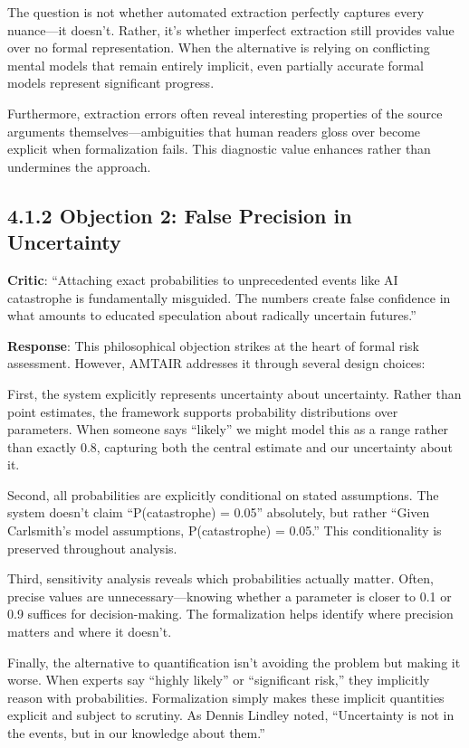 \documentclass[
  11pt,
  letterpaper,
  openany]{book}
\begin{document}
The question is not whether automated extraction perfectly captures
every nuance---it doesn't. Rather, it's whether imperfect extraction
still provides value over no formal representation. When the alternative
is relying on conflicting mental models that remain entirely implicit,
even partially accurate formal models represent significant progress.

Furthermore, extraction errors often reveal interesting properties of
the source arguments themselves---ambiguities that human readers gloss
over become explicit when formalization fails. This diagnostic value
enhances rather than undermines the approach.

\subsection{4.1.2 Objection 2: False Precision in
Uncertainty}\label{sec-false-precision}

\textbf{Critic}: ``Attaching exact probabilities to unprecedented events
like AI catastrophe is fundamentally misguided. The numbers create false
confidence in what amounts to educated speculation about radically
uncertain futures.''

\textbf{Response}: This philosophical objection strikes at the heart of
formal risk assessment. However, AMTAIR addresses it through several
design choices:

First, the system explicitly represents uncertainty about uncertainty.
Rather than point estimates, the framework supports probability
distributions over parameters. When someone says ``likely'' we might
model this as a range rather than exactly 0.8, capturing both the
central estimate and our uncertainty about it.

Second, all probabilities are explicitly conditional on stated
assumptions. The system doesn't claim ``P(catastrophe) = 0.05''
absolutely, but rather ``Given Carlsmith's model assumptions,
P(catastrophe) = 0.05.'' This conditionality is preserved throughout
analysis.

Third, sensitivity analysis reveals which probabilities actually matter.
Often, precise values are unnecessary---knowing whether a parameter is
closer to 0.1 or 0.9 suffices for decision-making. The formalization
helps identify where precision matters and where it doesn't.

Finally, the alternative to quantification isn't avoiding the problem
but making it worse. When experts say ``highly likely'' or ``significant
risk,'' they implicitly reason with probabilities. Formalization simply
makes these implicit quantities explicit and subject to scrutiny. As
Dennis Lindley noted, ``Uncertainty is not in the events, but in our
knowledge about them.''
\end{document}
